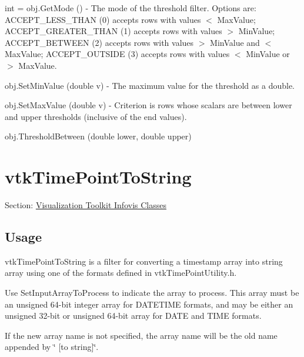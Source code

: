\begin{DoxyItemize}
\item {\ttfamily int = obj.\-Get\-Mode ()} -\/ The mode of the threshold filter. Options are\-: A\-C\-C\-E\-P\-T\-\_\-\-L\-E\-S\-S\-\_\-\-T\-H\-A\-N (0) accepts rows with values $<$ Max\-Value; A\-C\-C\-E\-P\-T\-\_\-\-G\-R\-E\-A\-T\-E\-R\-\_\-\-T\-H\-A\-N (1) accepts rows with values $>$ Min\-Value; A\-C\-C\-E\-P\-T\-\_\-\-B\-E\-T\-W\-E\-E\-N (2) accepts rows with values $>$ Min\-Value and $<$ Max\-Value; A\-C\-C\-E\-P\-T\-\_\-\-O\-U\-T\-S\-I\-D\-E (3) accepts rows with values $<$ Min\-Value or $>$ Max\-Value.  
\item {\ttfamily obj.\-Set\-Min\-Value (double v)} -\/ The maximum value for the threshold as a double.  
\item {\ttfamily obj.\-Set\-Max\-Value (double v)} -\/ Criterion is rows whose scalars are between lower and upper thresholds (inclusive of the end values).  
\item {\ttfamily obj.\-Threshold\-Between (double lower, double upper)}  
\end{DoxyItemize}\hypertarget{vtkinfovis_vtktimepointtostring}{}\section{vtk\-Time\-Point\-To\-String}\label{vtkinfovis_vtktimepointtostring}
Section\-: \hyperlink{sec_vtkinfovis}{Visualization Toolkit Infovis Classes} \hypertarget{vtkwidgets_vtkxyplotwidget_Usage}{}\subsection{Usage}\label{vtkwidgets_vtkxyplotwidget_Usage}
vtk\-Time\-Point\-To\-String is a filter for converting a timestamp array into string array using one of the formats defined in vtk\-Time\-Point\-Utility.\-h.

Use Set\-Input\-Array\-To\-Process to indicate the array to process. This array must be an unsigned 64-\/bit integer array for D\-A\-T\-E\-T\-I\-M\-E formats, and may be either an unsigned 32-\/bit or unsigned 64-\/bit array for D\-A\-T\-E and T\-I\-M\-E formats.

If the new array name is not specified, the array name will be the old name appended by \char`\"{} \mbox{[}to string\mbox{]}\char`\"{}.

